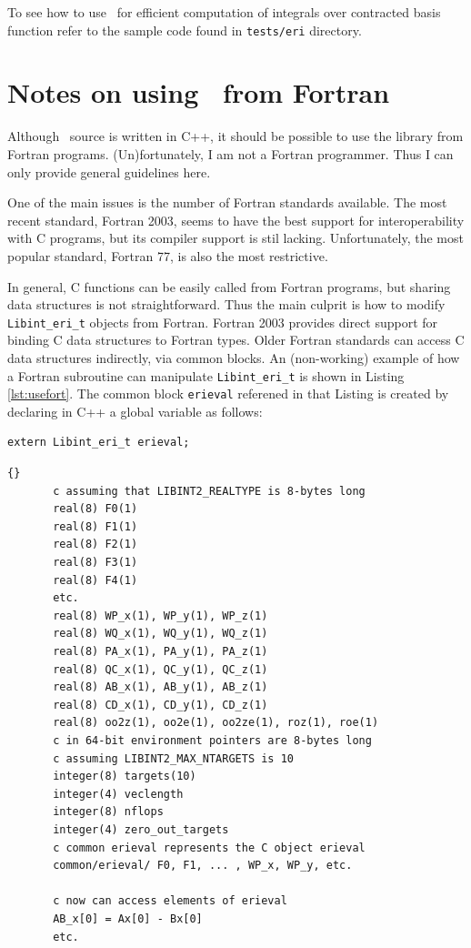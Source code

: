\documentclass[10pt]{article}
\begin{document}
To see how to use \LIBINT\ for efficient computation of integrals over
contracted basis function refer to the sample code found in
{\tt tests/eri} directory.

\section{Notes on using \LIBINT\ from Fortran \label{ssec:fort} }

Although \LIBINT\ source is written in C++, it should be possible to use the library
from Fortran programs. (Un)fortunately, I am not a Fortran programmer. Thus I can
only provide general guidelines here.

One of the main issues is the number of Fortran standards available. The most recent standard, Fortran 2003,
seems to have the best support for interoperability with C programs, but its compiler support is stil lacking.
Unfortunately, the most popular standard, Fortran 77, is also the most restrictive.

In general, C functions can be easily called from Fortran programs, but sharing data structures
is not straightforward. Thus the main culprit is how to modify  {\tt Libint\_eri\_t} objects
from Fortran. Fortran 2003 provides direct support for binding C data structures to
Fortran types. Older Fortran standards can access C data structures indirectly, via
common blocks. An (non-working) example of how a Fortran subroutine can manipulate {\tt Libint\_eri\_t}
is shown in Listing \ref{lst:usefort}. The
common block {\tt erieval} referened in that Listing is created by declaring
in C++ a global variable as follows:
\begin{verbatim}
extern Libint_eri_t erieval;
\end{verbatim}

\begin{lstlisting}[label=lst:usefort,caption=Accesing {\tt Libint\_eri\_t}
structure from a Fortran code.]{}
       c assuming that LIBINT2_REALTYPE is 8-bytes long
       real(8) F0(1)
       real(8) F1(1)
       real(8) F2(1)
       real(8) F3(1)
       real(8) F4(1)
       etc.
       real(8) WP_x(1), WP_y(1), WP_z(1)
       real(8) WQ_x(1), WQ_y(1), WQ_z(1)
       real(8) PA_x(1), PA_y(1), PA_z(1)
       real(8) QC_x(1), QC_y(1), QC_z(1)
       real(8) AB_x(1), AB_y(1), AB_z(1)
       real(8) CD_x(1), CD_y(1), CD_z(1)
       real(8) oo2z(1), oo2e(1), oo2ze(1), roz(1), roe(1)
       c in 64-bit environment pointers are 8-bytes long
       c assuming LIBINT2_MAX_NTARGETS is 10
       integer(8) targets(10)
       integer(4) veclength
       integer(8) nflops
       integer(4) zero_out_targets
       c common erieval represents the C object erieval
       common/erieval/ F0, F1, ... , WP_x, WP_y, etc.

       c now can access elements of erieval
       AB_x[0] = Ax[0] - Bx[0]
       etc.
\end{lstlisting}
\end{document}
